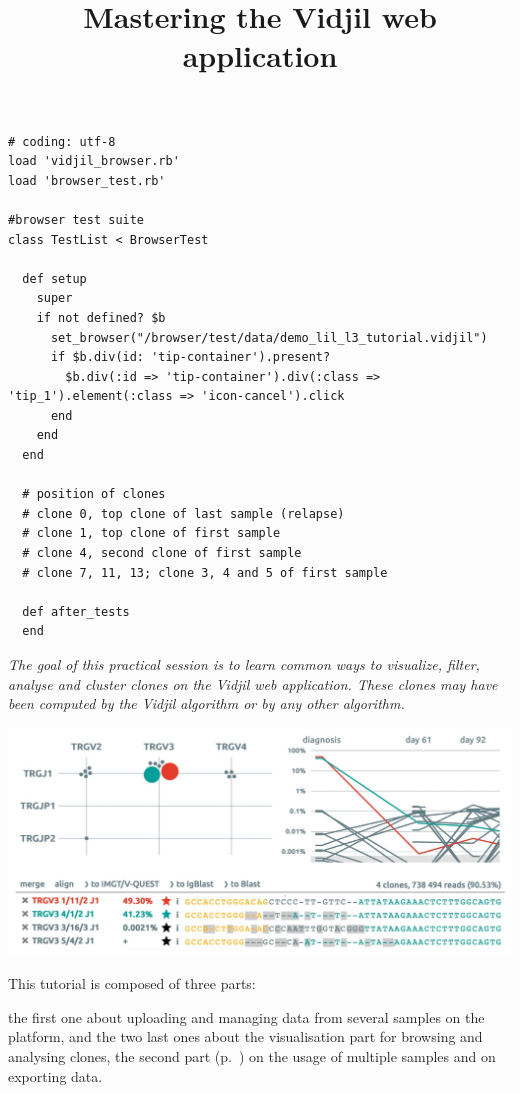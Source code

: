 \documentclass[11pt]{report}
\title{Mastering the Vidjil web application
}
\begin{document}
\begin{verbatim}
# coding: utf-8
load 'vidjil_browser.rb'
load 'browser_test.rb'

#browser test suite
class TestList < BrowserTest

  def setup
    super
    if not defined? $b
      set_browser("/browser/test/data/demo_lil_l3_tutorial.vidjil")
      if $b.div(id: 'tip-container').present?
        $b.div(:id => 'tip-container').div(:class => 'tip_1').element(:class => 'icon-cancel').click
      end
    end
  end

  # position of clones
  # clone 0, top clone of last sample (relapse)
  # clone 1, top clone of first sample
  # clone 4, second clone of first sample
  # clone 7, 11, 13; clone 3, 4 and 5 of first sample

  def after_tests
  end
\end{verbatim}


\maketitle

\textit{The goal of this practical session is to learn
common ways to visualize, filter, analyse and cluster clones
on the Vidjil web application.
%
These clones may have been computed by the Vidjil algorithm
or by any other algorithm.}

\bigskip


\centerline{\includegraphics[width=\textwidth]{vidjil-combined.jpg}}

\bigskip

This tutorial is composed of three parts:

the first one about uploading and managing data from several samples on the platform,
and the two last ones about the visualisation
part for browsing and analysing clones, the second part
(p.~\pageref{sec:part2}) on the usage of multiple samples and on exporting
data.
\end{document}
